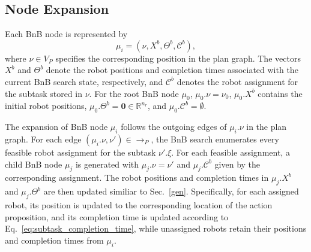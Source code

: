 \documentclass[lettersize,journal]{IEEEtran}
\theoremstyle{italiclemma}
\theoremstyle{italiclemma}
\theoremstyle{definition}
\begin{document}
\subsection{Node Expansion}

Each BnB node is represented by
$$
\mu_i=(\nu,X^b,\Theta^b,\mathcal C^b),
$$
where $\nu\in V_P$ specifies the corresponding position in the plan graph. The vectors $X^b$ and $\Theta^b$ denote the robot positions and completion times associated with the current BnB search state, respectively, and $\mathcal C^b$ denotes the robot assignment for the subtask stored in $\nu$. For the root BnB node $\mu_0$, $\mu_0.\nu  = \nu_0$, $\mu_0.X^b$ contains the initial robot positions,
$\mu_0.\Theta^b=\mathbf{0}\in\mathbb{R}^{n_r}$, and $\mu_0.\mathcal C^b=\emptyset$.

The expansion of  BnB node $\mu_i$ follows the outgoing edges of $\mu_i.\nu$ in the plan graph. For each edge
$(\mu_i.\nu,\nu')\in \rightarrow_P$, the BnB search enumerates every feasible robot assignment for the subtask $\nu'.\xi$. For each feasible assignment, a child BnB node $\mu_j$ is generated with $\mu_j.\nu=\nu'$  and $\mu_j.\mathcal C^b$ given by the corresponding assignment. The robot positions and completion times in $\mu_j.X^b$ and
$\mu_j.\Theta^b$ are then updated similiar to
Sec.~\ref{gen}. Specifically, for each assigned robot, its position is updated to the corresponding location of the action proposition, and its completion time is
updated according to Eq.~\eqref{eq:subtask_completion_time}, while unassigned robots retain their positions and completion times from $\mu_i$.




\end{document}
